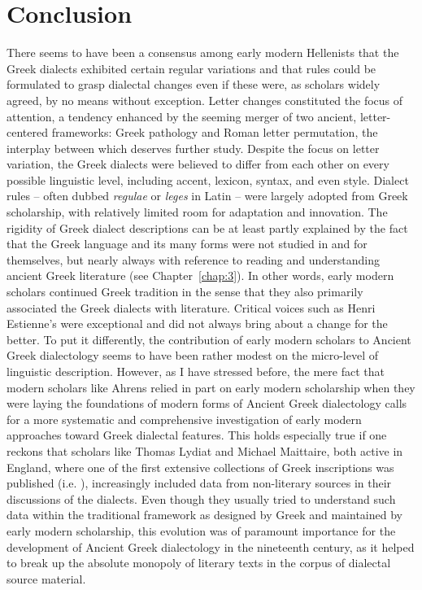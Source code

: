 \section{Conclusion}\label{sec:6.5}

There seems to have been a consensus among early modern Hellenists that the Greek dialects exhibited certain regular variations and that rules could be formulated to grasp dialectal changes even if these were, as scholars widely agreed, by no means without exception. Letter changes constituted the focus of attention, a tendency enhanced by the seeming merger of two ancient, letter-centered frameworks: Greek pathology and Roman letter permutation, the interplay between which deserves further study. Despite the focus on letter variation, the Greek dialects were believed to differ from each other on every possible linguistic level, including accent, lexicon, syntax, and even style. Dialect rules – often dubbed \textit{regulae} or \textit{leges} in Latin – were largely adopted from Greek scholarship, with relatively limited room for adaptation and innovation. The rigidity of Greek dialect descriptions can be at least partly explained by the fact that the Greek language and its many forms were not studied in and for themselves, but nearly always with reference to reading and understanding ancient Greek literature (see Chapter~\ref{chap:3}). In other words, early modern scholars continued Greek tradition in the sense that they also primarily associated the Greek dialects with literature. Critical voices such as Henri Estienne’s were exceptional and did not always bring about a change for the better. To put it differently, the contribution of early modern scholars to Ancient Greek dialectology seems to have been rather modest on the micro-level of linguistic description. However, as I have stressed before, the mere fact that modern scholars like Ahrens relied in part on early modern scholarship when they were laying the foundations of modern forms of Ancient Greek dialectology calls for a more systematic and comprehensive investigation of early modern approaches toward Greek dialectal features. This holds especially true if one reckons that scholars like Thomas Lydiat and Michael Maittaire, both active in England, where one of the first extensive collections of Greek inscriptions was published (i.e. \citealt{Prideaux1676}), increasingly included data from non-literary sources in their discussions of the dialects. Even though they usually tried to understand such data within the traditional framework as designed by Greek and maintained by early modern scholarship, this evolution was of paramount importance for the development of Ancient Greek dialectology in the nineteenth century, as it helped to break up the absolute monopoly of literary texts in the corpus of dialectal source material.

